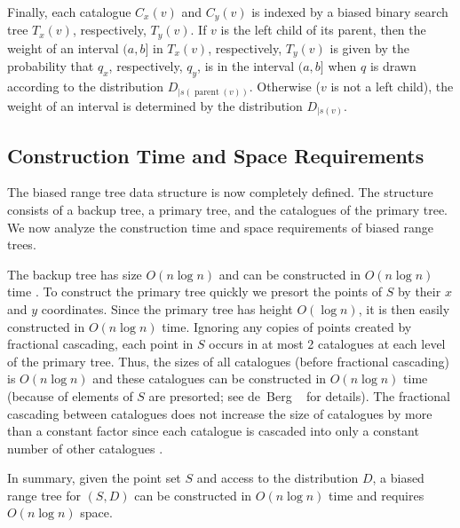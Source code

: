 \documentclass[charterfonts]{patmorin}
\DeclareMathOperator{\prnt}{parent}
\begin{document}

Finally, each catalogue $C_x(v)$ and $C_y(v)$ is indexed by a biased
binary search tree $T_x(v)$, respectively, $T_y(v)$.  If $v$ is the
left child of its parent, then the weight of an interval $(a,b]$ in
$T_x(v)$, respectively, $T_y(v)$ is given by the probability that
$q_x$, respectively, $q_y$, is in the interval $(a,b]$ when $q$ is
drawn according to the distribution $D_{\mid s(\prnt(v))}$.  Otherwise
($v$ is not a left child), the weight of an interval is determined by
the distribution $D_{\mid s(v)}$.

\subsection{Construction Time and Space Requirements}

The biased range tree data structure is now completely defined.  The
structure consists of a backup tree, a primary tree, and the
catalogues of the primary tree.  We now analyze the construction time
and space requirements of biased range trees.

The backup tree has size $O(n\log n)$ and can be constructed in
$O(n\log n)$ time \cite[Theorem~5.11]{bkos97}.  To construct the
primary tree quickly we presort the points of $S$ by their $x$ and $y$
coordinates.  Since the primary tree has height $O(\log n)$, it is
then easily constructed in $O(n\log n)$ time.  Ignoring any copies of
points created by fractional cascading, each point in $S$ occurs in at
most 2 catalogues at each level of the primary tree.  Thus, the sizes
of all catalogues (before fractional cascading) is $O(n\log n)$ and
these catalogues can be constructed in $O(n\log n)$ time (because of
elements of $S$ are presorted; see de~Berg \etal\
\cite[Section~5.3]{bkos97} for details).  The fractional cascading
between catalogues does not increase the size of catalogues by more
than a constant factor since each catalogue is cascaded into only a
constant number of other catalogues \cite{ae76}.

In summary, given the point set $S$ and access to the distribution
$D$, a biased range tree for $(S,D)$ can be constructed in $O(n\log
n)$ time and requires $O(n\log n)$ space.
\end{document}
